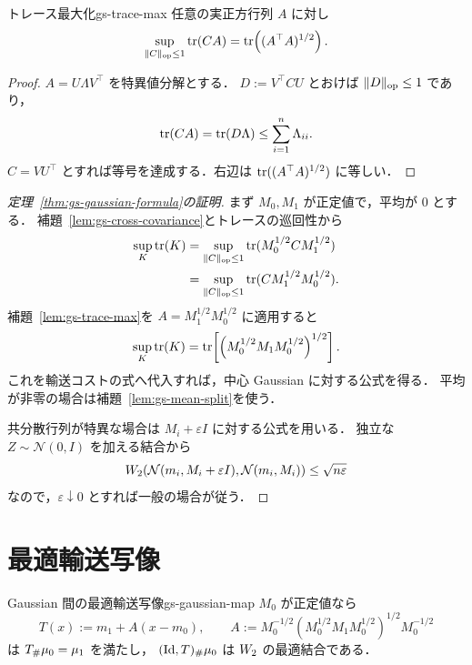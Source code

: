 \begin{lemma}{トレース最大化}{gs-trace-max}
  任意の実正方行列 $A$ に対し
  \[
    \sup_{\lVert C \rVert_{\mathrm{op}}\leq1}\operatorname{tr}(CA)
    =
    \operatorname{tr}\!\left((A^\top A)^{1/2}\right).
  \]
\end{lemma}

\begin{proof}
  $A=U\Lambda V^\top$ を特異値分解とする．
  $D:=V^\top C U$ とおけば $\lVert D \rVert_{\mathrm{op}}\leq1$ であり，
  \[
    \operatorname{tr}(CA)=\operatorname{tr}(D\Lambda)
    \leq\sum_{i=1}^n\Lambda_{ii}.
  \]
  $C=VU^\top$ とすれば等号を達成する．右辺は
  $\operatorname{tr}((A^\top A)^{1/2})$ に等しい．
\end{proof}

\begin{proof}[定理~\ref{thm:gs-gaussian-formula}の証明]
  まず $M_0,M_1$ が正定値で，平均が $0$ とする．
  補題~\ref{lem:gs-cross-covariance}とトレースの巡回性から
  \[
    \begin{aligned}
      \sup_K\operatorname{tr}(K)
      &=
      \sup_{\lVert C \rVert_{\mathrm{op}}\leq1}
      \operatorname{tr}(M_0^{1/2}CM_1^{1/2}) \\
      &=
      \sup_{\lVert C \rVert_{\mathrm{op}}\leq1}
      \operatorname{tr}(CM_1^{1/2}M_0^{1/2}).
    \end{aligned}
  \]
  補題~\ref{lem:gs-trace-max}を
  $A=M_1^{1/2}M_0^{1/2}$ に適用すると
  \[
    \sup_K\operatorname{tr}(K)
    =
    \operatorname{tr}\!\left[
      \left(
        M_0^{1/2}M_1M_0^{1/2}
      \right)^{1/2}
    \right].
  \]
  これを輸送コストの式へ代入すれば，中心 Gaussian に対する公式を得る．
  平均が非零の場合は補題~\ref{lem:gs-mean-split}を使う．

  共分散行列が特異な場合は
  $M_i+\varepsilon I$ に対する公式を用いる．
  独立な $Z\sim\mathcal{N}(0,I)$ を加える結合から
  \[
    W_2\!\left(
      \mathcal{N}(m_i,M_i+\varepsilon I),
      \mathcal{N}(m_i,M_i)
    \right)
    \leq\sqrt{n\varepsilon}
  \]
  なので，$\varepsilon\downarrow0$ とすれば一般の場合が従う．
\end{proof}

\section{最適輸送写像}
\label{sec:gaussian-map}

\begin{proposition}{Gaussian 間の最適輸送写像}{gs-gaussian-map}
  $M_0$ が正定値なら
  \[
    T(x)
    :=
    m_1+A(x-m_0),
    \qquad
    A
    :=
    M_0^{-1/2}
    \left(
      M_0^{1/2}M_1M_0^{1/2}
    \right)^{1/2}
    M_0^{-1/2}
  \]
  は $T_\#\mu_0=\mu_1$ を満たし，
  $(\mathrm{Id},T)_\#\mu_0$ は $W_2$ の最適結合である．
\end{proposition}

